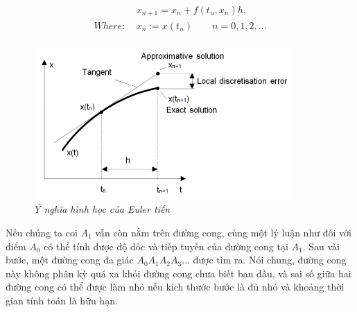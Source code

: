 \documentclass[13pt,a4paper]{article}
\begin{document}
				\begin{align*}
					&x_{n+1} = x_n + f(t_n,x_n)h, \\
					Where:\ &x_n := x(t_n) \qquad n = 0,1,2,...
				\end{align*}
				\begin{figure}[h!]
					\begin{center}
						\includegraphics[width=10cm]{euler.png}
						\caption{\textit{Ý nghĩa hình học của Euler tiến}}
					\end{center}
				\end{figure}
				Nếu chúng ta coi $\displaystyle A_{1}$ vẫn còn nằm trên đường cong, cùng một lý luận như đối với điểm $\displaystyle A_{0}$ có thể tính được độ dốc và tiếp tuyến của đường cong tại $\displaystyle A_{1}$. Sau vài bước, một đường cong đa giác $\displaystyle A_{0}A_{1}A_{2}A_{3}\dots$ được tìm ra. Nói chung, đường cong này không phân kỳ quá xa khỏi đường cong chưa biết ban đầu, và sai số giữa hai đường cong có thể được làm nhỏ nếu kích thước bước là đủ nhỏ và khoảng thời gian tính toán là hữu hạn.
\end{document}
